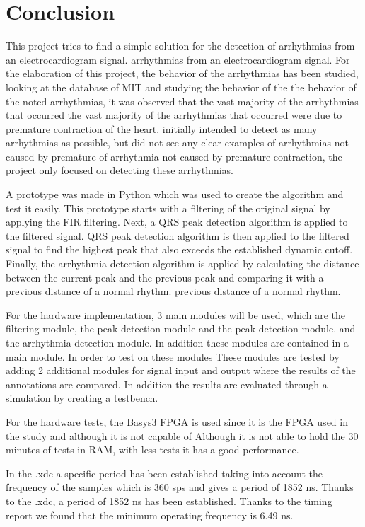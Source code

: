 \chapter*{Conclusion}

This project tries to find a simple solution for the detection of arrhythmias from an electrocardiogram signal. 
arrhythmias from an electrocardiogram signal. For the elaboration of this project, 
the behavior of the arrhythmias has been studied, looking at the database of MIT and studying the behavior of the
the behavior of the noted arrhythmias, it was observed that the vast majority of the arrhythmias that occurred 
the vast majority of the arrhythmias that occurred were due to premature contraction of the heart.
initially intended to detect as many arrhythmias as possible, but did not see any clear examples of arrhythmias not caused by premature
of arrhythmia not caused by premature contraction, the project only focused on detecting these arrhythmias.

A prototype was made in Python which was used to create the algorithm and test it easily. This prototype starts
with a filtering of the original signal by applying the FIR filtering. Next, a QRS peak detection algorithm is applied to the filtered signal. 
QRS peak detection algorithm is then applied to the filtered signal to find the highest peak that also exceeds the established dynamic cutoff.
Finally, the arrhythmia detection algorithm is applied by calculating the distance between the current peak and the previous peak and comparing it with a previous distance of a normal rhythm.
previous distance of a normal rhythm.

For the hardware implementation, 3 main modules will be used, which are the filtering module, the peak detection module and the peak detection module. 
and the arrhythmia detection module. In addition these modules are contained in a main module. In order to test on these modules
These modules are tested by adding 2 additional modules for signal input and output where the results of the annotations are compared. In addition 
the results are evaluated through a simulation by creating a testbench.

For the hardware tests, the Basys3 FPGA is used since it is the FPGA used in the study and although it is not capable of 
Although it is not able to hold the 30 minutes of tests in RAM, with less tests it has a good performance.

In the .xdc a specific period has been established taking into account the frequency of the samples which is 360 sps and gives a period of 1852 ns. Thanks to the .xdc, a period of 1852 ns has been established. 
Thanks to the timing report we found that the minimum operating frequency is 6.49 ns.

